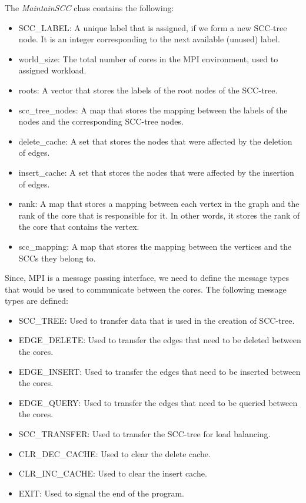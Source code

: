 The \textit{MaintainSCC} class contains the following:
\begin{itemize}
    \item \textsc{SCC\_LABEL}: A unique label that is assigned, if we form a new SCC-tree node. It is an integer corresponding to the next available (unused) label.
    \item world\_size: The total number of cores in the MPI environment, used to assigned workload.
    \item roots: A vector that stores the labels of the root nodes of the SCC-tree.
    \item scc\_tree\_nodes: A map that stores the mapping between the labels of the nodes and the corresponding SCC-tree nodes.
    \item delete\_cache: A set that stores the nodes that were affected by the deletion of edges.
    \item insert\_cache: A set that stores the nodes that were affected by the insertion of edges.
    \item rank: A map that stores a mapping between each vertex in the graph and the rank of the core that is responsible for it. In other words, it stores the rank of the core that contains the vertex.
    \item scc\_mapping: A map that stores the mapping between the vertices and the SCCs they belong to.
\end{itemize}

Since, MPI is a message passing interface, we need to define the message types that would be used to communicate between the cores. The following message types are defined:
\begin{itemize}
    \item SCC\_TREE: Used to transfer data that is used in the creation of SCC-tree.
    \item EDGE\_DELETE: Used to transfer the edges that need to be deleted between the cores.
    \item EDGE\_INSERT: Used to transfer the edges that need to be inserted between the cores.
    \item EDGE\_QUERY: Used to transfer the edges that need to be queried between the cores.
    \item SCC\_TRANSFER: Used to transfer the SCC-tree for load balancing.
    \item CLR\_DEC\_CACHE: Used to clear the delete cache.
    \item CLR\_INC\_CACHE: Used to clear the insert cache.
    \item EXIT: Used to signal the end of the program.
\end{itemize}

